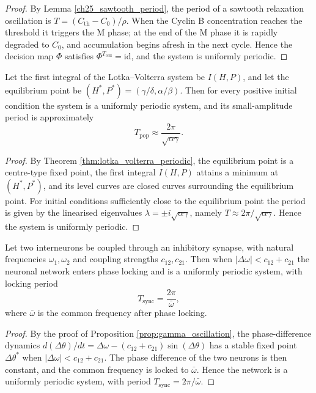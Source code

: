\begin{proof}
By Lemma \ref{ch25_sawtooth_period}, the period of a sawtooth relaxation oscillation is $T=(C_{\text{th}}-C_0)/\rho$. When the Cyclin B concentration reaches the threshold it triggers the M phase; at the end of the M phase it is rapidly degraded to $C_0$, and accumulation begins afresh in the next cycle. Hence the decision map $\Phi$ satisfies $\Phi^{T_{\text{cell}}}=\mathrm{id}$, and the system is uniformly periodic.
\end{proof}

\begin{lemma}\label{lem:population_periodic}
Let the first integral of the Lotka--Volterra system be $I(H,P)$, and let the equilibrium point be $(H^*,P^*)=(\gamma/\delta,\alpha/\beta)$. Then for every positive initial condition the system is a uniformly periodic system, and its small-amplitude period is approximately
\[
T_{\text{pop}} \approx \frac{2\pi}{\sqrt{\alpha\gamma}}.
\]
\end{lemma}

\begin{proof}
By Theorem \ref{thm:lotka_volterra_periodic}, the equilibrium point is a centre-type fixed point, the first integral $I(H,P)$ attains a minimum at $(H^*,P^*)$, and its level curves are closed curves surrounding the equilibrium point. For initial conditions sufficiently close to the equilibrium point the period is given by the linearised eigenvalues $\lambda=\pm i\sqrt{\alpha\gamma}$, namely $T\approx 2\pi/\sqrt{\alpha\gamma}$. Hence the system is uniformly periodic.
\end{proof}

\begin{lemma}\label{lem:neural_periodic}
Let two interneurons be coupled through an inhibitory synapse, with natural frequencies $\omega_1,\omega_2$ and coupling strengths $c_{12},c_{21}$. Then when $|\Delta\omega| < c_{12}+c_{21}$ the neuronal network enters phase locking and is a uniformly periodic system, with locking period
\[
T_{\text{sync}} = \frac{2\pi}{\bar\omega},
\]
where $\bar\omega$ is the common frequency after phase locking.
\end{lemma}

\begin{proof}
By the proof of Proposition \ref{prop:gamma_oscillation}, the phase-difference dynamics $d(\Delta\theta)/dt = \Delta\omega - (c_{12}+c_{21})\sin(\Delta\theta)$ has a stable fixed point $\Delta\theta^*$ when $|\Delta\omega| < c_{12}+c_{21}$. The phase difference of the two neurons is then constant, and the common frequency is locked to $\bar\omega$. Hence the network is a uniformly periodic system, with period $T_{\text{sync}}=2\pi/\bar\omega$.
\end{proof}

